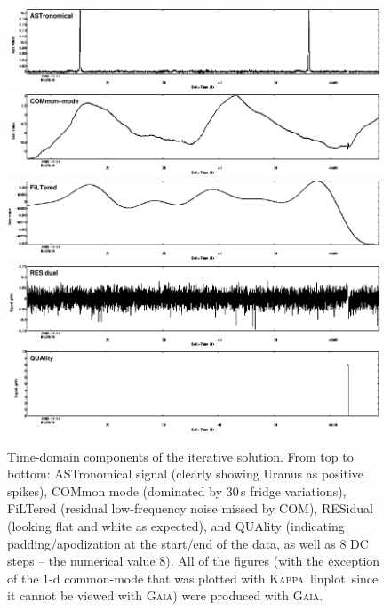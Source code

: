\documentclass[twoside,11pt]{article}
\newcommand{\xref}[3]{#1}
\renewcommand{\_}{\texttt{\symbol{95}}}
\newcommand{\Kappa}{\xref{\textsc{Kappa}}{sun95}{}}
\newcommand{\gaia}{\xref{\textsc{Gaia}}{sun214}{}}
\newcommand{\task}[1]{\textsf{#1}}
\newcommand{\linplot}{\xref{\task{linplot}}{sun95}{LINPLOT}}
\begin{document}
\begin{figure}
\begin{center}
\includegraphics[width=\linewidth]{sc19_iter_ast} \\
\includegraphics[width=\linewidth]{sc19_iter_com} \\
\includegraphics[width=\linewidth]{sc19_iter_flt} \\
\includegraphics[width=\linewidth]{sc19_iter_res} \\
\includegraphics[width=\linewidth]{sc19_iter_qua} \\
\caption{Time-domain components of the iterative solution. From top to
  bottom: ASTronomical signal (clearly showing Uranus as positive
  spikes), COMmon mode (dominated by 30\,s fridge variations),
  FiLTered (residual low-frequency noise missed by COM), RESidual
  (looking flat and white as expected), and QUAlity (indicating
  padding/apodization at the start/end of the data, as well as 8 DC
  steps -- the numerical value 8). All of the figures (with the
  exception of the 1-d common-mode that was plotted with \Kappa\
  \linplot\ since it cannot be viewed with \gaia) were produced with
  \gaia.}
\label{fig:itercomp}
\end{center}
\end{figure}
\end{document}

